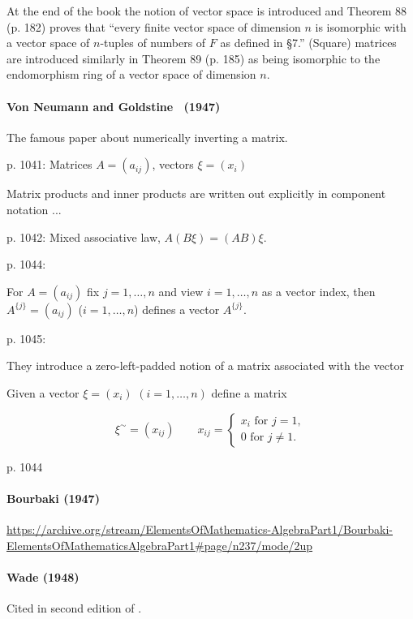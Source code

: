 At the end of the book the notion of vector space is introduced and Theorem 88
(p. 182) proves that ``every finite vector space of dimension $n$ is isomorphic with a
vector space of $n$-tuples of numbers of $F$ as defined in \S7.''
(Square) matrices are introduced similarly in Theorem 89 (p. 185) as being
isomorphic to the endomorphism ring of a vector space of dimension $n$.

\paragraph{Von Neumann and Goldstine~\cite{VonNeumann1947} (1947)}

The famous paper about numerically inverting a matrix.

p. 1041: Matrices $A = (a_{ij})$, vectors $\xi = (x_i)$

Matrix products and inner products are written out explicitly in component notation
...

p. 1042: Mixed associative law, $A(B\xi) = (AB)\xi$.

p. 1044:

For $A=(a_{ij})$ fix $j=1,\dots,n$ and view $i=1,\dots,n$ as a vector index, then $A^{\{j\}} = (a_{ij})$ ($i=1,\dots,n$) defines a vector $A^{\{j\}}$.

p. 1045:

They introduce a zero-left-padded notion of a matrix associated with the vector

Given a vector $\xi = (x_i)$ $(i=1,\dots,n)$ define a matrix

\[
\xi^\sim = (x_{ij}) \qquad x_{ij} = \begin{cases}
x_i\textrm{ for }j=1,\\
0\textrm{ for }j\ne1.
\end{cases}
\]

p. 1044




\paragraph{Bourbaki (1947)}
\url{https://archive.org/stream/ElementsOfMathematics-AlgebraPart1/Bourbaki-ElementsOfMathematicsAlgebraPart1#page/n237/mode/2up}

\paragraph{Wade (1948)~\cite{Wade1948}}

Cited in second edition of \cite{Margenau1943}.

